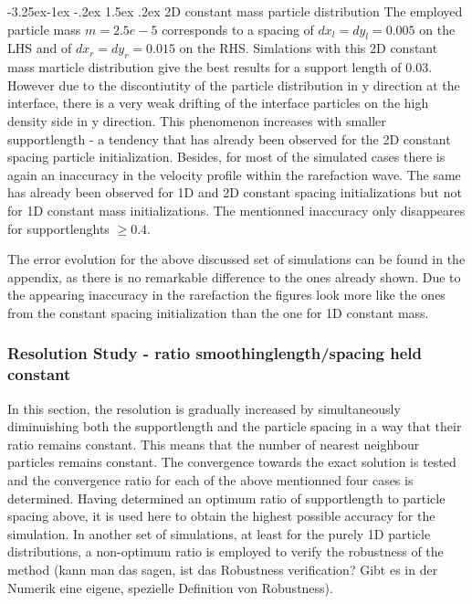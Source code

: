 \documentclass{report}
\makeatletter
\renewcommand\paragraph{\@startsection{paragraph}{4}{\z@}%
  {-3.25ex\@plus -1ex \@minus -.2ex}%
  {1.5ex \@plus .2ex}%
  {\normalfont\normalsize\bfseries}}
\makeatother
\begin{document}
\paragraph{2D constant mass particle distribution}
The employed particle mass $m=2.5e-5$ corresponds to a spacing of $dx_l=dy_l=0.005$ on the LHS and of $dx_r=dy_r=0.015$ on the RHS.
Simlations with this 2D constant mass marticle distribution give the best results for a support length of 0.03. However due to the discontiutity of the particle distribution in y direction at the interface, there is a very weak drifting of the interface particles on the high density side in y direction. This phenomenon increases with smaller supportlength - a tendency that has already been observed for the 2D constant spacing particle initialization. 
Besides, for most of the simulated cases there is again an inaccuracy in the velocity profile  within the rarefaction wave. The same has already been observed for 1D and 2D constant spacing initializations but not for 1D constant mass initializations.
The mentionned inaccuracy only disappeares for supportlenghts $\geq0.4$.

The error evolution for the above discussed set of simulations can be found in the appendix, as there is no remarkable difference to the ones already shown. Due to the appearing inaccuracy in the rarefaction the figures look more like the ones from the constant spacing initialization than the one for 1D constant mass. 



\subsubsection{Resolution Study - ratio smoothinglength/spacing held constant}
In this section, the resolution is gradually increased by simultaneously diminuishing both the supportlength and the particle spacing in a way that their ratio remains constant. This means that the number of nearest neighbour particles remains constant. 
The convergence towards the exact solution is tested and the convergence ratio for each of the above mentionned four cases is determined. Having determined an optimum ratio of supportlength to particle spacing above, it is used here to obtain the highest possible accuracy for the simulation. In another set of simulations, at least for the purely 1D particle distributions, a non-optimum ratio is employed to verify the robustness of the method (kann man das sagen, ist das Robustness verification? Gibt es in der Numerik eine eigene, spezielle Definition von Robustness).
\end{document}
